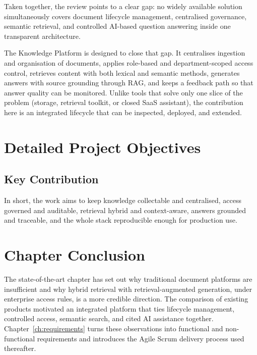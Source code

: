 Taken together, the review points to a clear gap: no widely available solution
simultaneously covers document lifecycle management, centralised governance,
semantic retrieval, and controlled AI-based question answering inside one
transparent architecture.

The Knowledge Platform is designed to close that gap. It centralises ingestion and
organisation of documents, applies role-based and department-scoped access
control, retrieves content with both lexical and semantic methods, generates
answers with source grounding through RAG, and keeps a feedback path so that
answer quality can be monitored. Unlike tools that solve only one slice of the
problem (storage, retrieval toolkit, or closed SaaS assistant), the contribution
here is an integrated lifecycle that can be inspected, deployed, and extended.

\section{Detailed Project Objectives}

\subsection{Key Contribution}

In short, the work aims to keep knowledge collectable and centralised, access
governed and auditable, retrieval hybrid and context-aware, answers grounded and
traceable, and the whole stack reproducible enough for production use.

\section{Chapter Conclusion}

The state-of-the-art chapter has set out why traditional document platforms are
insufficient and why hybrid retrieval with retrieval-augmented generation, under
enterprise access rules, is a more credible direction. The comparison of existing
products motivated an integrated platform that ties lifecycle management,
controlled access, semantic search, and cited AI assistance together.
Chapter~\ref{ch:requirements} turns these observations into functional and
non-functional requirements and introduces the Agile Scrum delivery process used
thereafter.
